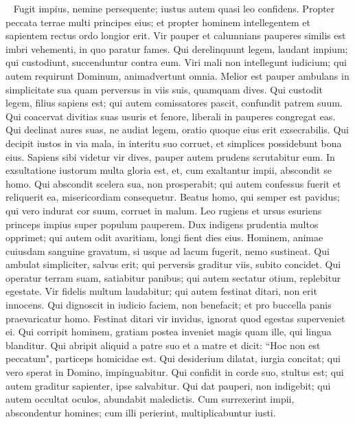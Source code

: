 \begin{biblechapter}   
\verse Fugit impius, nemine persequente; iustus autem quasi leo confidens. 
\verse Propter peccata terrae multi principes eius; et propter hominem intellegentem et sapientem rectus ordo longior erit. 
\verse Vir pauper et calumnians pauperes similis est imbri vehementi, in quo paratur fames. 
\verse Qui derelinquunt legem, laudant impium; qui custodiunt, succenduntur contra eum. 
\verse Viri mali non intellegunt iudicium; qui autem requirunt Dominum, animadvertunt omnia. 
\verse Melior est pauper ambulans in simplicitate sua quam perversus in viis suis, quamquam dives. 
\verse Qui custodit legem, filius sapiens est; qui autem comissatores pascit, confundit patrem suum. 
\verse Qui coacervat divitias suas usuris et fenore, liberali in pauperes congregat eas. 
\verse Qui declinat aures suas, ne audiat legem, oratio quoque eius erit exsecrabilis. 
\verse Qui decipit iustos in via mala, in interitu suo corruet, et simplices possidebunt bona eius. 
\verse Sapiens sibi videtur vir dives, pauper autem prudens scrutabitur eum. 
\verse In exsultatione iustorum multa gloria est, et, cum exaltantur impii, abscondit se homo. 
\verse Qui abscondit scelera sua, non prosperabit; qui autem confessus fuerit et reliquerit ea, misericordiam consequetur. 
\verse Beatus homo, qui semper est pavidus; qui vero indurat cor suum, corruet in malum. 
\verse Leo rugiens et ursus esuriens princeps impius super populum pauperem. 
\verse Dux indigens prudentia multos opprimet; qui autem odit avaritiam, longi fient dies eius. 
\verse Hominem, animae cuiusdam sanguine gravatum, si usque ad lacum fugerit, nemo sustineat. 
\verse Qui ambulat simpliciter, salvus erit; qui perversis graditur viis, subito concidet. 
\verse Qui operatur terram suam, satiabitur panibus; qui autem sectatur otium, replebitur egestate. 
\verse Vir fidelis multum laudabitur; qui autem festinat ditari, non erit innocens. 
\verse Qui dignoscit in iudicio faciem, non benefacit; et pro buccella panis praevaricatur homo. 
\verse Festinat ditari vir invidus, ignorat quod egestas superveniet ei. 
\verse Qui corripit hominem, gratiam postea inveniet magis quam ille, qui lingua blanditur. 
\verse Qui abripit aliquid a patre suo et a matre et dicit: “Hoc non est peccatum", particeps homicidae est. 
\verse Qui desiderium dilatat, iurgia concitat; qui vero sperat in Domino, impinguabitur. 
\verse Qui confidit in corde suo, stultus est; qui autem graditur sapienter, ipse salvabitur. 
\verse Qui dat pauperi, non indigebit; qui autem occultat oculos, abundabit maledictis. 
\verse Cum surrexerint impii, abscondentur homines; cum illi perierint, multiplicabuntur iusti. 
\end{biblechapter}

